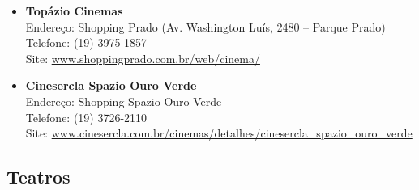 \begin{itemize}
    \item   \textbf{Topázio Cinemas}
        \\Endereço: Shopping Prado (Av. Washington Luís, 2480 -- Parque Prado)
        \\Telefone: (19) 3975-1857
        \\Site: \url{www.shoppingprado.com.br/web/cinema/}

    \item   \textbf{Cinesercla Spazio Ouro Verde}
        \\Endereço: Shopping Spazio Ouro Verde
        \\Telefone: (19) 3726-2110
        \\Site: \url{www.cinesercla.com.br/cinemas/detalhes/cinesercla_spazio_ouro_verde}

\end{itemize}

\subsection{Teatros}

